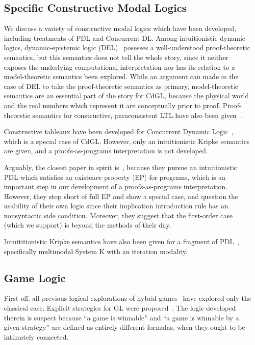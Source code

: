 \documentclass[12pt]{cmuthesis}
\theoremstyle{definition}
\theoremstyle{remark}
\newcommand{\CdGL}{\textsf{CdGL}\xspace}
\begin{document}
\subsection{Specific Constructive Modal Logics}
We discuss  a variety of constructive modal logics which have been developed, including treatments of PDL and Concurrent DL.
Among intuitionistic dynamic logics, dynamic-epistemic logic (DEL)~\cite{DBLP:journals/logcom/FrittellaGKPS16} posesses a well-understood proof-theoretic semantics, but this semantics does not tell the whole story, since it neither exposes the underlying computational interpretation nor has its relation to a model-theoretic semantics been explored.
While an argument can made in the case of DEL to take the proof-theoretic semantics as primary, model-theoretic semantics are an essential part of the story for \CdGL, because the physical world and the real numbers which represent it are conceptually prior to proof.
Proof-theoretic semantics for constructive, paraconsistent LTL have also been given~\cite{DBLP:journals/japll/KamideW10}.

Constructive tableaux have been developed for Concurrent Dynamic Logic~\cite{DBLP:journals/apal/WijesekeraN05}, which is a special case of \CdGL.
However, only an intuitionistic Kripke semantics are given, and a proofs-as-programs interpretation is not developed.

Arguably, the closest paper in spirit is~\cite{degen2006towards}, because they pursue an intuitionistic PDL which satisfies an existence property (EP) for programs, which is an important step in our development of a proofs-as-programs interpretation.
However, they stop short of full EP and show a special case, and question the usability of their own logic since their implication introduction rule has an nonsyntactic side condition.
Moreover, they suggest that the first-order case (which we support) is beyond the methods of their day.

Intuititionistic Kripke semantics have also been given for a fragment of PDL~\cite{DBLP:journals/fuin/Celani01}, specifically multimodal System K with an iteration modality.

\subsection{Game Logic}
First off, all previous logical explorations of hybrid games~\cite{DBLP:conf/cade/QueselP12,DBLP:journals/tocl/Platzer15,DBLP:journals/tocl/Platzer17,DBLP:conf/cade/Platzer18} have explored only the classical case.
Explicit strategies for GL were proposed~\cite{ghosh2008strategies}.
The logic developed therein is suspect because ``a game is winnable'' and ``a game is winnable by a given strategy'' are defined as entirely different formulas, when they ought to be intimately connected.
\end{document}
